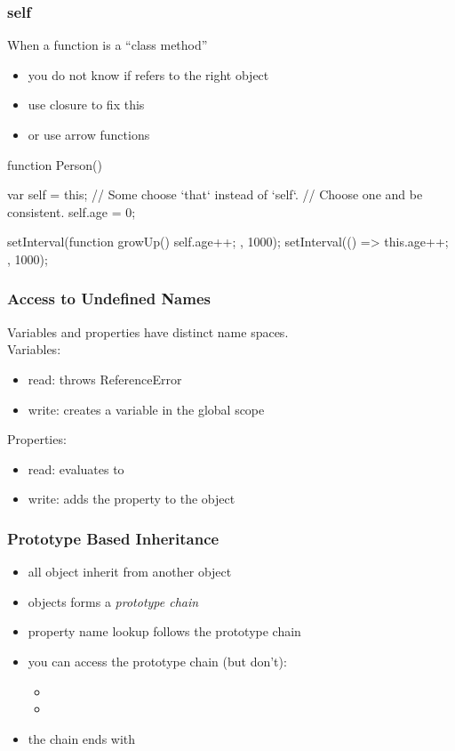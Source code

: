 \begin{frame}[fragile] \frametitle{self}
When a function is a ``class method''
\begin{itemize}
  \item you do not know if  refers to the right object
  \item use closure to fix this
  \item or use arrow functions
\end{itemize}
\begin{CodeBox}{}
function Person() {
  var self = this; // Some choose `that` instead of `self`. 
                   // Choose one and be consistent.
  self.age = 0;

  setInterval(function growUp() { self.age++; }, 1000);
  setInterval(() => { this.age++;  }, 1000);
}
\end{CodeBox}
\end{frame}
\begin{frame}[fragile] \frametitle{Access to Undefined Names}
Variables and properties have distinct name spaces.
\\ \vspace{4mm}
Variables:
\begin{itemize}
  \item read: throws ReferenceError
  \item write: creates a variable in the global scope
\end{itemize}
\vspace{5mm}
Properties:
\begin{itemize}
  \item read: evaluates to 
  \item write: adds the property to the object
\end{itemize}
\end{frame}

\begin{frame}[fragile] \frametitle{Prototype Based Inheritance}

\begin{itemize}
  \item all object inherit from another object
  \item objects forms a \emph{prototype chain}
  \item property name lookup follows the prototype chain
  \item you can access the prototype chain (but don't):
  \begin{itemize}
    \item {}
    \item {}
  \end{itemize}
  \item the chain ends with 
\end{itemize}
\end{frame}

